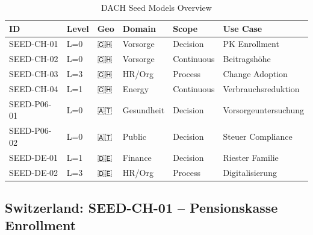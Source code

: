 \begin{table}[htbp]
\centering
\caption{DACH Seed Models Overview}
\label{tab:fff-seed-overview}
\renewcommand{\arraystretch}{1.2}
\small
\begin{tabular}{@{}llllll@{}}
\toprule
\textbf{ID} & \textbf{Level} & \textbf{Geo} & \textbf{Domain} & \textbf{Scope} & \textbf{Use Case} \\
\midrule
SEED-CH-01 & L=0 & 🇨🇭 & Vorsorge & Decision & PK Enrollment \\
SEED-CH-02 & L=0 & 🇨🇭 & Vorsorge & Continuous & Beitragshöhe \\
SEED-CH-03 & L=3 & 🇨🇭 & HR/Org & Process & Change Adoption \\
SEED-CH-04 & L=1 & 🇨🇭 & Energy & Continuous & Verbrauchsreduktion \\
\addlinespace
SEED-P06-01 & L=0 & 🇦🇹 & Gesundheit & Decision & Vorsorgeuntersuchung \\
SEED-P06-02 & L=0 & 🇦🇹 & Public & Decision & Steuer Compliance \\
\addlinespace
SEED-DE-01 & L=1 & 🇩🇪 & Finance & Decision & Riester Familie \\
SEED-DE-02 & L=3 & 🇩🇪 & HR/Org & Process & Digitalisierung \\
\bottomrule
\end{tabular}
\end{table}

\subsection{Switzerland: SEED-CH-01 -- Pensionskasse Enrollment}


